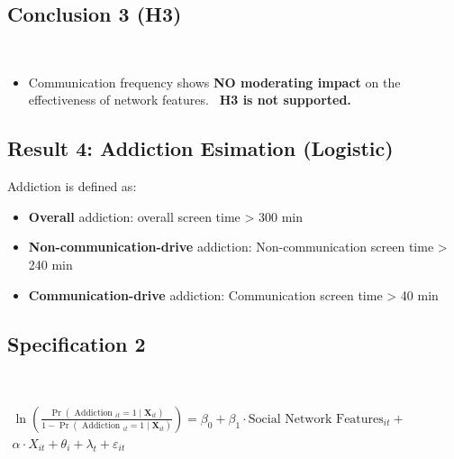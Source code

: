\documentclass[
  letterpaper,
  DIV=11,
  numbers=noendperiod]{scrartcl}
\providecommand{\tightlist}{%
  \setlength{\itemsep}{0pt}\setlength{\parskip}{0pt}}\usepackage{longtable,booktabs,array}
\begin{document}
\hypertarget{conclusion-3-h3}{%
\subsection{Conclusion 3 (H3)}\label{conclusion-3-h3}}

~

\begin{itemize}
\tightlist
\item
  Communication frequency shows \textbf{NO moderating impact} on the
  effectiveness of network features. ~\textbf{H3 is not supported.}
\end{itemize}

\hypertarget{result-4-addiction-esimation-logistic}{%
\subsection{Result 4: Addiction Esimation
(Logistic)}\label{result-4-addiction-esimation-logistic}}

\hfill\break
Addiction is defined as:

\begin{itemize}
\item
  \textbf{Overall} addiction: overall screen time \textgreater{} 300 min
\item
  \textbf{Non-communication-drive} addiction: Non-communication screen
  time \textgreater{} 240 min
\item
  \textbf{Communication-drive} addiction: Communication screen time
  \textgreater{} 40 min
\end{itemize}

\hypertarget{specification-2}{%
\subsection{Specification 2}\label{specification-2}}

~

\(\begin{equation} \begin{split} \ln \left(\frac{\operatorname{Pr}\left(\text { Addiction }_{it}=1 \mid \boldsymbol{X}_{i t}\right)}{1-\operatorname{Pr}\left(\text { Addiction }_{it}=1 \mid \boldsymbol{X}_{i t}\right)}\right) = \beta_{0}+\beta_{1} \cdot \text{Social Network Features}_{it}+ \\ \alpha \cdot X_{it}+\theta_{i} +\lambda_{t}+\varepsilon_{it} \end{split} \label{e2} \end{equation}\)\\
\end{document}
